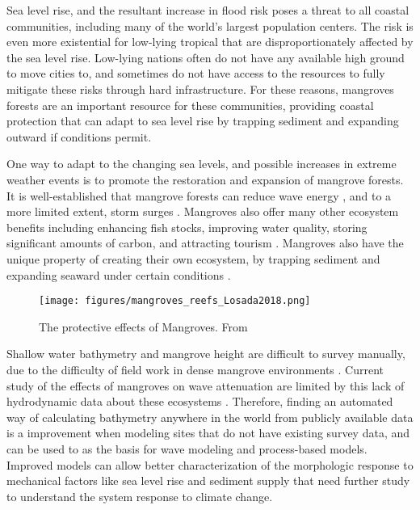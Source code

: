 Sea level rise, and the resultant increase in flood risk poses a threat to all coastal communities, including many of the world's largest population centers. The risk is even more existential for low-lying tropical that are disproportionately affected by the sea level rise. Low-lying nations often do not have any available high ground to move cities to, and sometimes do not have access to the resources to fully mitigate these risks through hard infrastructure. For these reasons, mangroves forests are an important resource for these communities, providing coastal protection that can adapt to sea level rise by trapping sediment and expanding outward if conditions permit.

One way to adapt to the changing sea levels, and possible increases in extreme weather events is to promote the restoration and expansion of mangrove forests. It is well-established that mangrove forests can reduce wave energy \parencite{Maza2019,Menendez2020,Hadi2003,Sanchez-Nunez2020}, and to a more limited extent, storm surges \parencite{Montgomery2019a,Chen2021,Mcivor2012}. Mangroves also offer many other ecosystem benefits including enhancing fish stocks, improving water quality, storing significant amounts of carbon, and attracting tourism \parencite{Atkinson2016b}. Mangroves also have the unique property of creating their own ecosystem, by trapping sediment and expanding seaward under certain conditions \parencite{Gijsman2021}.

\begin{figure}[htbp]
      \centering
      \texttt{[image: figures/mangroves\_reefs\_Losada2018.png]}
      \caption{The protective effects of Mangroves. From \parencite{Losada2018}}
      \label{mangrove-protection-diagram}
\end{figure}

Shallow water bathymetry and mangrove height are difficult to survey manually, due to the difficulty of field work in dense mangrove environments \parencite{Gijsman2021}. Current study of the effects of mangroves on wave attenuation are limited by this lack of hydrodynamic data about these ecosystems \parencite{Horstman2014}.  Therefore, finding an automated way of calculating bathymetry anywhere in the world from publicly available data is a improvement when modeling sites that do not have existing survey data, and can be used to as the basis for wave modeling and process-based models. Improved models can allow better characterization of the morphologic response to mechanical factors like sea level rise and sediment supply that need further study to understand the system response to climate change.

